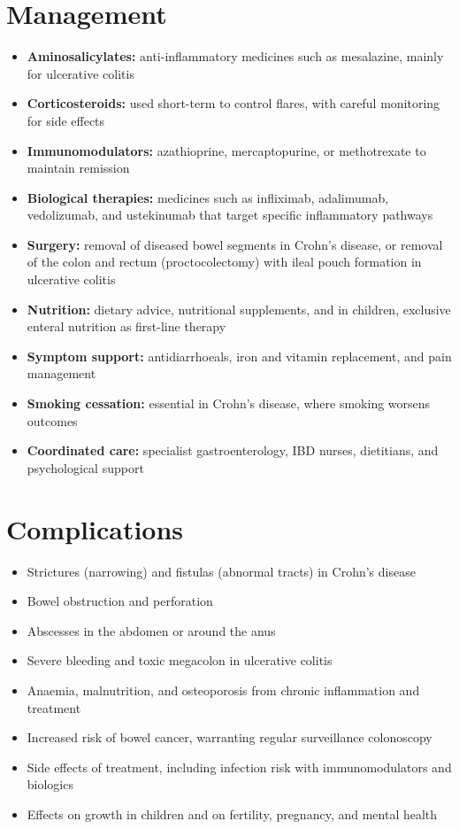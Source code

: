 \section*{Management}
\begin{itemize}
    \item \textbf{Aminosalicylates:} anti-inflammatory medicines such as mesalazine, mainly for ulcerative colitis
    \item \textbf{Corticosteroids:} used short-term to control flares, with careful monitoring for side effects
    \item \textbf{Immunomodulators:} azathioprine, mercaptopurine, or methotrexate to maintain remission
    \item \textbf{Biological therapies:} medicines such as infliximab, adalimumab, vedolizumab, and ustekinumab that target specific inflammatory pathways
    \item \textbf{Surgery:} removal of diseased bowel segments in Crohn's disease, or removal of the colon and rectum (proctocolectomy) with ileal pouch formation in ulcerative colitis
    \item \textbf{Nutrition:} dietary advice, nutritional supplements, and in children, exclusive enteral nutrition as first-line therapy
    \item \textbf{Symptom support:} antidiarrhoeals, iron and vitamin replacement, and pain management
    \item \textbf{Smoking cessation:} essential in Crohn's disease, where smoking worsens outcomes
    \item \textbf{Coordinated care:} specialist gastroenterology, IBD nurses, dietitians, and psychological support
\end{itemize}

\section*{Complications}
\begin{itemize}
    \item Strictures (narrowing) and fistulas (abnormal tracts) in Crohn's disease
    \item Bowel obstruction and perforation
    \item Abscesses in the abdomen or around the anus
    \item Severe bleeding and toxic megacolon in ulcerative colitis
    \item Anaemia, malnutrition, and osteoporosis from chronic inflammation and treatment
    \item Increased risk of bowel cancer, warranting regular surveillance colonoscopy
    \item Side effects of treatment, including infection risk with immunomodulators and biologics
    \item Effects on growth in children and on fertility, pregnancy, and mental health
\end{itemize}

